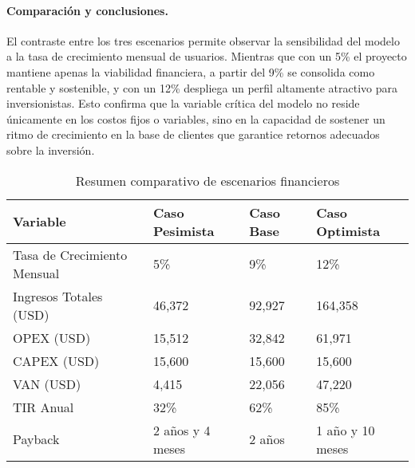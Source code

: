 \paragraph{Comparación y conclusiones.}  
El contraste entre los tres escenarios permite observar la sensibilidad del modelo a la tasa de crecimiento mensual de usuarios. Mientras que con un 5\% el proyecto mantiene apenas la viabilidad financiera, a partir del 9\% se consolida como rentable y sostenible, y con un 12\% despliega un perfil altamente atractivo para inversionistas. Esto confirma que la variable crítica del modelo no reside únicamente en los costos fijos o variables, sino en la capacidad de sostener un ritmo de crecimiento en la base de clientes que garantice retornos adecuados sobre la inversión.


\begin{table}[t]
    \centering
    \renewcommand{\arraystretch}{1.3}
    \caption{Resumen comparativo de escenarios financieros}
    \label{tab:escenarios_financieros}
    \begin{tabular}{|p{4cm}|p{2.5cm}|p{2.5cm}|p{3cm}|}
        \hline
        \textbf{Variable} & \textbf{Caso Pesimista} & \textbf{Caso Base} & \textbf{Caso Optimista} \\
        \hline
        Tasa de Crecimiento Mensual & 5\% & 9\% & 12\% \\
        \hline
        Ingresos Totales (USD) & 46,372 & 92,927 & 164,358 \\
        \hline
        OPEX (USD) & 15,512 & 32,842 & 61,971 \\
        \hline
        CAPEX (USD) & 15,600 & 15,600 & 15,600 \\
        \hline
        VAN (USD) & 4,415 & 22,056 & 47,220 \\
        \hline
        TIR Anual & 32\% & 62\% & 85\% \\
        \hline
        Payback & 2 años y 4 meses & 2 años & 1 año y 10 meses \\
        \hline
    \end{tabular}
\end{table}
